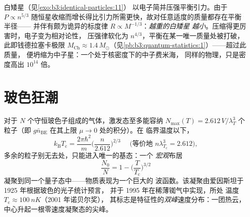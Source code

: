 \begin{example}[靠不相容性支撑的恒星]\label{ex:b3:quantum-statistics:dwarf}
白矮星（见\cref{exo:b3:identical-particles:11}）
以电子简并压强平衡引力。由于 $P \propto
n^{5/3}$ 随恒星收缩而增长得比引力所需更快，故对任意适度的质量都存在平衡半径——
并伴有颇为诡异的标度律
$R \propto M^{-1/3}$：\emph{越重的白矮星
越小}。压缩得更厉害时，电子变为相对论性，
压强律软化为 $n^{4/3}$，平衡在某一唯一质量处被打破，
此即钱德拉塞卡极限 $M_{\text{Ch}} \approx
1.4\,M_\odot$（见\cref{pb:b3:quantum-statistics:1}）——超过此质量，
便坍缩为中子星：一个处于核密度下的中子费米海，
同样的物理，只是密度高出 $10^{14}$ 倍。
\end{example}

\section{玻色狂潮}

\begin{theorem}[玻色–爱因斯坦凝聚]\label{thm:b3:quantum-statistics:bec}
对于 $N$ 个守恒玻色子组成的气体，激发态至多能容纳
$N_{\max}(T) = 2.612\,V/\lambda_T^3$ 个粒子（即
$g\bar n_{\text{BE}}$ 在其上限 $\mu \to 0$ 处的积分）。在
临界温度以下，
\[
k_{\text{B}}T_{\text{c}} = \frac{2\pi\hbar^2}{m}
\Big(\frac{n}{2.612}\Big)^{2/3}
\quad\text{ (等价地 } n\lambda_{T_{\text{c}}}^3 = 2.612
\text{)} ,
\]
多余的粒子别无去处，只能进入唯一的基态：一个
\emph{宏观}布居
\[
\frac{N_0}{N} = 1 - \Big(\frac{T}{T_{\text{c}}}\Big)^{3/2}
\]
凝聚到同一个量子态中——物质表现为一个巨大的
波函数。该凝聚由爱因斯坦于 1925 年根据玻色的光子统计预言，
并于 1995 年在稀薄铷气中实现，所处
温度 $T_{\text{c}} \approx \qty{100}{nK}$（2001 年诺贝尔奖），
其标志是特征性的\emph{双峰}速度分布：一团热云，
中心升起一根零速度凝聚态的尖峰。
\end{theorem}
\admitted

